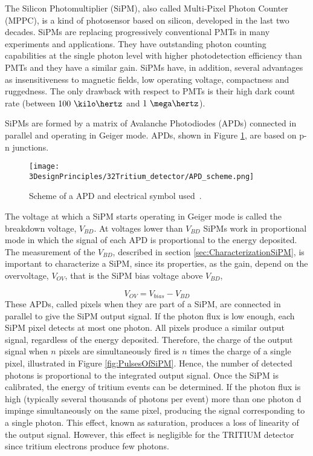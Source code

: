 The Silicon Photomultiplier (SiPM), also called Multi-Pixel Photon Counter (MPPC), is a kind of photosensor based on silicon, developed in the last two decades. SiPMs are replacing progressively conventional PMTs in many experiments and applications. They have outstanding photon counting capabilities at the single photon level with higher photodetection efficiency than PMTs and they have a similar gain. SiPMs have, in addition, several advantages as insensitiveness to magnetic fields, low operating voltage, compactness and ruggedness. The only drawback with respect to PMTs is their high dark count rate (between $100~\kilo\hertz$ and $1~\mega\hertz$).

SiPMs are formed by a matrix of Avalanche Photodiodes (APDs) connected in parallel and operating in Geiger mode. APDs, shown in Figure \ref{fig:SchemeAPD}, are based on p-n junctions. %

\begin{figure}[htbp]
\centering
\texttt{[image: 3DesignPrinciples/32Tritium\_detector/APD\_scheme.png]}
\caption{Scheme of a APD and electrical symbol used\label{fig:SchemeAPD}~\cite{OSI}.}
\end{figure}
 The voltage at which a SiPM starts operating in Geiger mode is called the breakdown voltage, $V_ {BD}$. At voltages lower than $V_ {BD}$ SiPMs work in proportional mode in which the signal of each APD is proportional to the energy deposited. The measurement of the $V_ {BD}$, described in section \ref{sec:CharacterizationSiPM}, is important to characterize a SiPM, since its properties, as the gain, depend on the overvoltage, $V_{OV}$, that is the SiPM bias voltage above $V_ {BD}$,

\begin{equation}
V_{OV}=V_{bias}-V_{BD}
\label{overvoltage}
\end{equation}
These APDs, called pixels when they are part of a SiPM, are connected in parallel to give the SiPM output signal. If the photon flux is low enough, each SiPM pixel detects at most one photon. All pixels produce a similar output signal, regardless of the energy deposited. Therefore, the charge of the output signal when $n$ pixels are simultaneously fired is $n$ times the charge of a single pixel, illustrated in Figure \ref{fig:PulsesOfSiPM}. Hence, the number of detected photons is proportional to the integrated output signal. Once the SiPM is calibrated, the energy of tritium events can be determined. If the photon flux is high (typically several thousands of photons per event) more than one photon d impinge simultaneously on the same pixel, producing the signal corresponding to a single photon. This effect, known as saturation, produces a loss of linearity of the output signal. However, this effect is negligible for the TRITIUM detector since tritium electrons produce few photons. %

